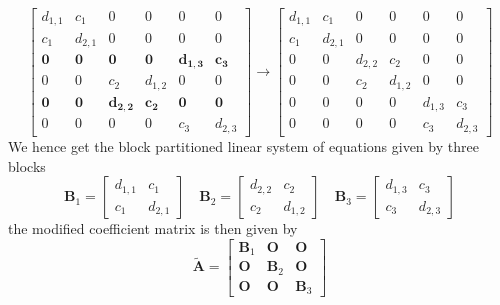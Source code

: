 \documentclass{article}
\begin{document}
\begin{equation*}
    \begin{bmatrix}
        d_{1,1}  & c_{1} & 0 & 0 & 0& 0 \\
        c_{1} & d_{2,1}  & 0 & 0 & 0  & 0 \\
        \mathbf{0} & \mathbf{0} & \mathbf{0}& \mathbf{0} & \mathbf{d_{1,3}} & \mathbf{c_{3}} \\
        0 & 0 & c_{2}& d_{1,2} & 0 & 0 \\
        \mathbf{0} & \mathbf{0} & \mathbf{d_{2,2}} & \mathbf{c_{2}} & \mathbf{0}  & \mathbf{0} \\
        0 & 0 & 0 & 0 & c_{3} & d_{2,3}
    \end{bmatrix}  \longrightarrow
    \begin{bmatrix}
        d_{1,1}  & c_{1} & 0 & 0 & 0& 0 \\
        c_{1} & d_{2,1}  & 0 & 0 & 0  & 0\\
        0 & 0 & d_{2,2}& c_{2} & 0 & 0 \\
        0 & 0 & c_{2}& d_{1,2} & 0 & 0 \\
        0 & 0 & 0 & 0 & d_{1,3}  & c_{3} \\
        0 & 0 & 0 & 0 & c_{3} & d_{2,3}
    \end{bmatrix} 
\end{equation*}
We hence get the block partitioned linear system of equations given by three blocks
\begin{equation*}
    \mathbf{B}_{1} = \begin{bmatrix}
        d_{1,1} & c_{1} \\
        c_{1} & d_{2,1}
    \end{bmatrix} \quad \mathbf{B}_{2} = \begin{bmatrix}
        d_{2,2} & c_{2} \\
        c_{2} & d_{1,2}
    \end{bmatrix} \quad \mathbf{B}_{3} = \begin{bmatrix}
        d_{1,3} & c_{3} \\
        c_{3} & d_{2,3}
    \end{bmatrix}
\end{equation*}
the modified coefficient matrix is then given by
\begin{equation*}
    \tilde{\mathbf{A}} = \begin{bmatrix}
        \mathbf{B}_{1} & \mathbf{O} & \mathbf{O} \\
        \mathbf{O} & \mathbf{B}_{2} & \mathbf{O} \\
        \mathbf{O} & \mathbf{O} & \mathbf{B}_{3}
    \end{bmatrix}
\end{equation*}
\end{document}
